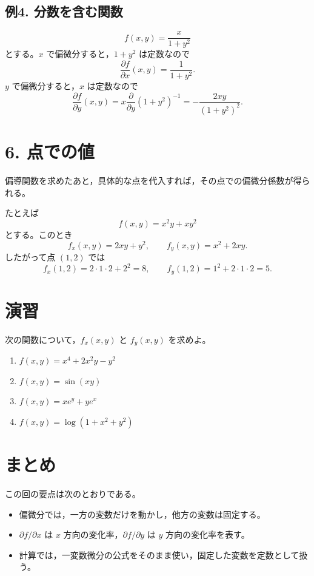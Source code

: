 \documentclass[a4paper,11pt]{jsarticle}
\begin{document}
\subsection*{例4. 分数を含む関数}

\[
f(x,y)=\frac{x}{1+y^2}
\]
とする。$x$ で偏微分すると，$1+y^2$ は定数なので
\[
\frac{\partial f}{\partial x}(x,y)=\frac{1}{1+y^2}.
\]
$y$ で偏微分すると，$x$ は定数なので
\[
\frac{\partial f}{\partial y}(x,y)
=x\frac{\partial}{\partial y}(1+y^2)^{-1}
=-\frac{2xy}{(1+y^2)^2}.
\]

\section*{6. 点での値}

偏導関数を求めたあと，具体的な点を代入すれば，その点での偏微分係数が得られる。

たとえば
\[
f(x,y)=x^2y+xy^2
\]
とする。このとき
\[
f_x(x,y)=2xy+y^2,\qquad f_y(x,y)=x^2+2xy.
\]
したがって点 $(1,2)$ では
\[
f_x(1,2)=2\cdot 1\cdot 2+2^2=8,
\qquad
f_y(1,2)=1^2+2\cdot 1\cdot 2=5.
\]

\section*{演習}

次の関数について，$f_x(x,y)$ と $f_y(x,y)$ を求めよ。
\begin{enumerate}[leftmargin=2em]
\item $f(x,y)=x^4+2x^2y-y^2$
\item $f(x,y)=\sin(xy)$
\item $f(x,y)=x e^y+y e^x$
\item $f(x,y)=\log(1+x^2+y^2)$
\end{enumerate}

\section*{まとめ}

この回の要点は次のとおりである。
\begin{itemize}[leftmargin=2em]
\item 偏微分では，一方の変数だけを動かし，他方の変数は固定する。
\item $\partial f/\partial x$ は $x$ 方向の変化率，$\partial f/\partial y$ は $y$ 方向の変化率を表す。
\item 計算では，一変数微分の公式をそのまま使い，固定した変数を定数として扱う。
\end{itemize}
\end{document}
